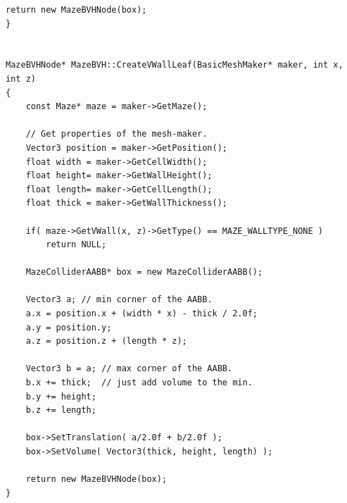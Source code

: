 \begin{lstlisting}[caption=The \texttt{MazeBVH} class]
    return new MazeBVHNode(box);
}


MazeBVHNode* MazeBVH::CreateVWallLeaf(BasicMeshMaker* maker, int x, int z)
{
    const Maze* maze = maker->GetMaze();
    
    // Get properties of the mesh-maker.
    Vector3 position = maker->GetPosition();
    float width = maker->GetCellWidth();
    float height= maker->GetWallHeight();
    float length= maker->GetCellLength();
    float thick = maker->GetWallThickness();
    
    if( maze->GetVWall(x, z)->GetType() == MAZE_WALLTYPE_NONE )
        return NULL;
    
    MazeColliderAABB* box = new MazeColliderAABB();
    
    Vector3 a; // min corner of the AABB.
    a.x = position.x + (width * x) - thick / 2.0f;
    a.y = position.y;
    a.z = position.z + (length * z);
    
    Vector3 b = a; // max corner of the AABB.
    b.x += thick;  // just add volume to the min.
    b.y += height;
    b.z += length;
    
    box->SetTranslation( a/2.0f + b/2.0f );
    box->SetVolume( Vector3(thick, height, length) );
    
    return new MazeBVHNode(box);
}
\end{lstlisting}
